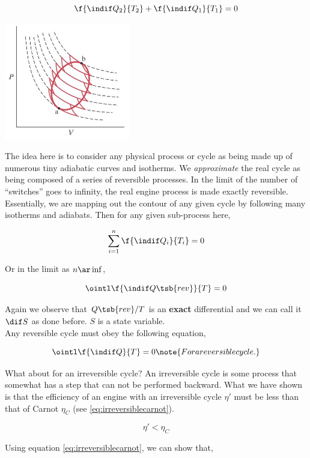 \documentclass{article}
\begin{document}
\[ \f{\indif Q_2}{T_2} + \f{\indif Q_1}{T_1} = 0  \]

\begin{center}
    \includegraphics[height=2in]{figures/reversible_composition.jpg}
\end{center}

The idea here is to consider any physical process or cycle as being made up of numerous tiny adiabatic curves and isotherms. We \textit{approximate} the real cycle as being composed of a series of reversible processes. In the limit of the number of ``switches'' goes to infinity, the real engine process is made exactly reversible. \\

Essentially, we are mapping out the contour of any given cycle by following many isotherms and adiabats. Then for any given sub-process here,

\[ \sum_{i=1}^{n} \f{\indif Q_i}{T_i} = 0 \]

Or in the limit as $n \ar \inf$,

\[ \ointl \f{\indif Q\tsb{rev}}{T} = 0 \]

Again we observe that $Q\tsb{rev}/T$ is an \textbf{exact} differential and we can call it $\dif S$ as done before. $S$ is a state variable. \\

Any reversible cycle must obey the following equation,

\[ \ointl \f{\indif Q}{T} = 0 \note{For a reversible cycle.} \]

What about for an irreversible cycle? An irreversible cycle is some process that somewhat has a step that can not be performed backward. What we have shown is that the efficiency of an engine with an irreversible cycle $\eta'$ must be less than that of Carnot $\eta_C$ (see \eqref{eq:irreversiblecarnot}).

\[ \eta' < \eta_C\]

Using equation \eqref{eq:irreversiblecarnot}, we can show that,
\end{document}
